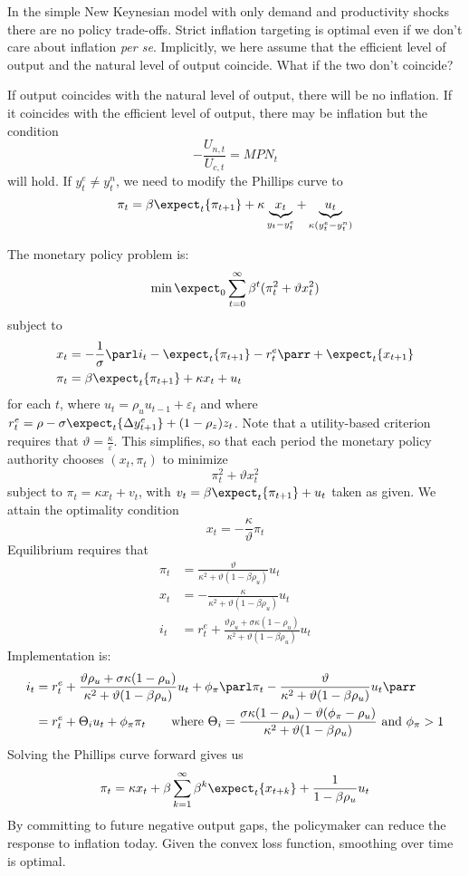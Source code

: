 \documentclass[10pt]{article}
\begin{document}
\begin{remark}
	In the simple New Keynesian model with only demand and productivity shocks there are no policy trade-offs. Strict inflation targeting is optimal even if we don't care about inflation \emph{per se}. Implicitly, we here assume that the efficient level of output and the natural level of output coincide. What if the two don't coincide?
\end{remark}
If output coincides with the natural level of output, there will be no inflation. If it coincides with the efficient level of output, there may be inflation but the condition \[-\frac{U_{n,t}}{U_{c,t}} = MPN_t\]will hold. If $y^e_t \ne y^n_t$, we need to modify the Phillips curve to\[\pi_t = \beta \expect_t \{\pi_{t+1}\} + \kappa \underbrace{x_t}_{y_t - y_t^e} + \underbrace{u_t}_{\kappa(y_t^e - y_t^n)}\]


The monetary policy problem is:
\[\min \expect_0 \sum_{t=0}^\infty \beta^t (\pi_t^2 + \vartheta x_t^2)\]subject to \begin{align*} x_t &= -\frac{1}{\sigma} \parl i_t - \expect_t\{\pi_{t+1}\} - r_t^e\parr + \expect_t\{x_{t+1}\} \\ \pi_t &= \beta \expect_t\{\pi_{t+1}\} + \kappa x_t + u_t\end{align*}for each $t$, where $u_t = \rho_u u_{t-1} + \varepsilon_t$ and where $r_t^e = \rho - \sigma \expect_t \{\Delta y_{t+1}^e\} + (1-\rho_z)z_t$. Note that a utility-based criterion requires that $\vartheta = \frac{\kappa}{\varepsilon}$. This simplifies, so that each period the monetary policy authority chooses $(x_t,\pi_t)$ to minimize \[\pi_t^2 + \vartheta x_t^2\]subject to $\pi_t = \kappa x_t + v_t$, with $v_t = \beta \expect_t\{\pi_{t+1}\} + u_t$ taken as given. We attain the optimality condition \[x_t = -\frac{\kappa}{\vartheta}\pi_t\]Equilibrium requires that \begin{align*} \pi_t &= \frac{\vartheta}{\kappa^2 + \vartheta (1-\beta\rho_u)}u_t \\ x_t &= -\frac{\kappa}{\kappa^2 + \vartheta (1-\beta\rho_u)}u_t \\ i_t &= r_t^e + \frac{\vartheta \rho_u + \sigma \kappa (1-\rho_u)}{\kappa^2 + \vartheta (1-\beta \rho_u)}u_t\end{align*} Implementation is:
\begin{align*}
	i_t &= r_t^e + \frac{\vartheta \rho_u + \sigma \kappa (1-\rho_u)}{\kappa^2 + \vartheta (1-\beta \rho_u)}u_t + \phi_\pi \parl \pi_t - \frac{\vartheta}{\kappa^2 + \vartheta(1-\beta \rho_u)}u_t\parr \\ &= r_t^e + \Theta_i u_t + \phi_\pi \pi_t \qquad \text{where } \Theta_i = \frac{\sigma \kappa(1-\rho_u) - \vartheta (\phi_\pi - \rho_u)}{\kappa^2 + \vartheta (1-\beta \rho_u)} \text{ and } \phi_\pi > 1
\end{align*}
Solving the Phillips curve forward gives us \[\pi_t = \kappa x_t + \beta \sum_{k=1}^\infty \beta^k \expect_t \{x_{t+k}\}+ \frac{1}{1-\beta\rho_u}u_t\]By committing to future negative output gaps, the policymaker can reduce the response to inflation today. Given the convex loss function, smoothing over time is optimal. 
\end{document}
